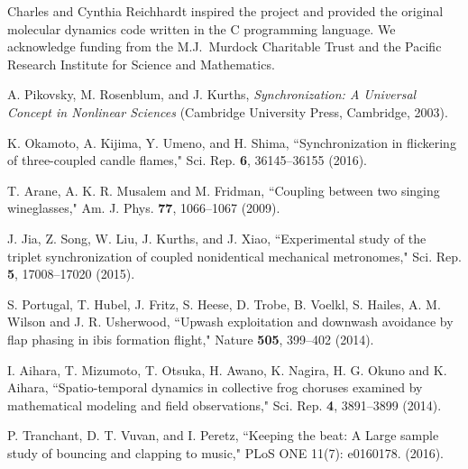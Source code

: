 \documentclass[preprint,showpacs,preprintnumbers,amsmath,amssymb,aps,prb]{revtex4-1}
\theoremstyle{remark}
\begin{document}
\begin{acknowledgments}

  Charles and Cynthia Reichhardt
  inspired the project and
  provided the original molecular dynamics code
  written in the C programming language.
  We acknowledge funding from the M.J.\ Murdock Charitable Trust
  and the Pacific Research Institute for Science and Mathematics. %

\end{acknowledgments}

\begin{thebibliography}{99}

 A. Pikovsky, M. Rosenblum, and J. Kurths, {\it Synchronization: A Universal Concept in Nonlinear Sciences} (Cambridge University Press, Cambridge, 2003).
  
 K. Okamoto, A. Kijima, Y. Umeno, and H. Shima, ``Synchronization in flickering of three-coupled candle flames," Sci. Rep. {\bf 6}, 36145--36155 (2016).

 T. Arane, A. K. R. Musalem and M. Fridman, ``Coupling between two singing wineglasses," Am. J. Phys. {\bf 77}, 1066--1067 (2009). %
  
  J. Jia, Z. Song, W. Liu, J. Kurths, and J. Xiao, ``Experimental study of the triplet synchronization of coupled nonidentical mechanical metronomes," Sci. Rep. {\bf 5}, 17008--17020 (2015).

  
 S. Portugal, T. Hubel, J. Fritz, S. Heese, D. Trobe, B. Voelkl, S. Hailes, A. M. Wilson and J. R. Usherwood,   ``Upwash exploitation and downwash avoidance by flap phasing in ibis formation flight," Nature {\bf 505}, 399--402 (2014).

   I. Aihara, T. Mizumoto, T. Otsuka, H. Awano, K. Nagira, H. G. Okuno and K. Aihara, ``Spatio-temporal dynamics in collective frog choruses examined by mathematical modeling and field observations," Sci. Rep. {\bf 4}, 3891--3899 (2014). 

   P. Tranchant, D. T. Vuvan, and I. Peretz, ``Keeping the beat: A Large sample study of bouncing and clapping to music," PLoS ONE 11(7): e0160178. (2016).


\end{thebibliography}
\end{document}
